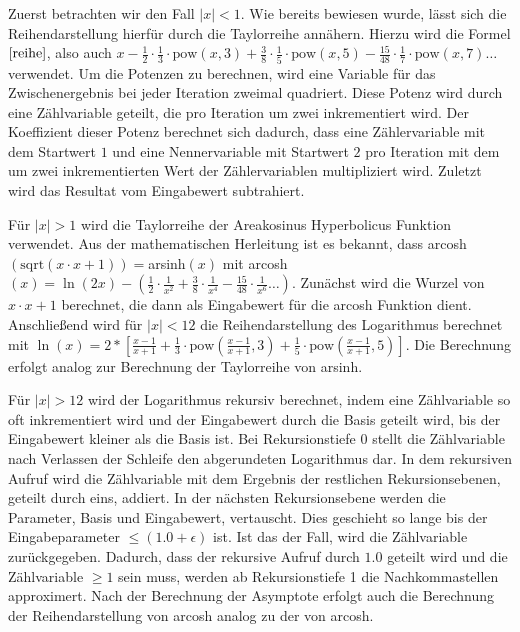 \documentclass[course=erap]{aspdoc}
\begin{document}
    Zuerst betrachten wir den Fall $|x|<1$. Wie bereits bewiesen wurde, lässt sich die Reihendarstellung hierfür durch die Taylorreihe annähern. Hierzu wird die Formel $\eqref{reihe}$, also auch $x-\frac{1}{2}\cdot \frac{1}{3}\cdot \text{pow}(x,3) +\frac{3}{8}\cdot \frac{1}{5}\cdot \text{pow}(x,5) -\frac{15}{48}\cdot \frac{1}{7}\cdot \text{pow}(x,7) \ldots$ verwendet. Um die Potenzen zu berechnen, wird eine Variable für das Zwischenergebnis bei jeder Iteration zweimal quadriert.
Diese Potenz wird durch eine Zählvariable geteilt, die pro Iteration um zwei inkrementiert wird.
  Der Koeffizient dieser Potenz berechnet sich dadurch, dass eine Zählervariable mit dem Startwert $1$ und eine Nennervariable mit Startwert $2$ pro Iteration mit dem um zwei inkrementierten Wert der Zählervariablen multipliziert wird.
Zuletzt wird das Resultat vom Eingabewert subtrahiert.

 Für $|x|>1$ wird die Taylorreihe der Areakosinus Hyperbolicus Funktion
 verwendet. Aus der mathematischen Herleitung ist es bekannt, dass arcosh$(\text{sqrt}(x\cdot x+1))=$arsinh$(x)$ mit arcosh$(x)= \ln(2x)-(\frac{1}{2}\cdot\frac{1}{x^2}+\frac{3}{8}\cdot\frac{1}{x^4}-\frac{15}{48}\cdot\frac{1}{x^6}\ldots)$. Zunächst wird die Wurzel von $x\cdot x+1$ berechnet, die dann als Eingabewert für die arcosh Funktion dient.
Anschließend wird für $|x|<12$ die Reihendarstellung des Logarithmus berechnet mit $\ln(x)=2*[ \frac{x-1}{x+1} + \frac{1}{3} \cdot \text{pow}(\frac{x-1}{x+1},3) + \frac{1}{5} \cdot \text{pow}(\frac{x-1}{x+1},5)]$. Die Berechnung erfolgt analog zur Berechnung der Taylorreihe von arsinh.

Für $|x|>12$ wird der Logarithmus rekursiv berechnet, indem eine Zählvariable so oft inkrementiert wird und der Eingabewert durch die Basis geteilt wird, bis der Eingabewert kleiner als die Basis ist. Bei Rekursionstiefe 0  stellt die Zählvariable nach Verlassen der Schleife den abgerundeten Logarithmus dar. In dem rekursiven Aufruf wird die Zählvariable
mit dem Ergebnis der restlichen Rekursionsebenen, geteilt durch eins, addiert. In der nächsten Rekursionsebene werden die Parameter, Basis und Eingabewert, vertauscht. Dies geschieht so lange bis der Eingabeparameter $\leq (1.0 + \epsilon)$ ist. Ist das der Fall, wird die Zählvariable zurückgegeben. Dadurch, dass der rekursive Aufruf durch $1.0$ geteilt wird und die Zählvariable $\geq 1$ sein muss, werden ab Rekursionstiefe 1 die Nachkommastellen approximert.
Nach der Berechnung der Asymptote erfolgt auch die Berechnung der Reihendarstellung von arcosh
analog zu der von arcosh. 
\end{document}
